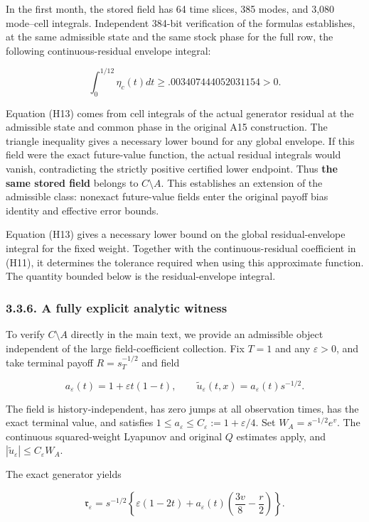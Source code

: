 \documentclass[a4paper,11pt]{article}
\begin{document}
In the first month, the stored field has 64 time slices, 385 modes, and 3,080 mode–cell integrals. Independent 384-bit verification of the formulas establishes, at the same admissible state and the same stock phase for the full row, the following continuous-residual envelope integral:

\[
\int_{0}^{1/12}\eta_c(t)dt\ge
.003407444052031154>0.
\tag{H13}
\]

Equation (H13) comes from cell integrals of the actual generator residual at the admissible state and common phase in the original A15 construction. The triangle inequality gives a necessary lower bound for any global envelope. If this field were the exact future-value function, the actual residual integrals would vanish, contradicting the strictly positive certified lower endpoint. Thus \textbf{the same stored field} belongs to $C\setminus A$. This establishes an extension of the admissible class: nonexact future-value fields enter the original payoff bias identity and effective error bounds.

Equation (H13) gives a necessary lower bound on the global residual-envelope integral for the fixed weight. Together with the continuous-residual coefficient in (H11), it determines the tolerance required when using this approximate function. The quantity bounded below is the residual-envelope integral.

\subsubsection*{3.3.6. A fully explicit analytic witness}

To verify \(C\setminus A\) directly in the main text, we provide an admissible object independent of the large field-coefficient collection. Fix \(T=1\) and any \(\varepsilon>0\), and take terminal payoff \(R=s_T^{-1/2}\) and field

\[
a_\varepsilon(t)=1+\varepsilon t(1-t),\qquad
\widetilde u_\varepsilon(t,x)=a_\varepsilon(t)s^{-1/2}.
\tag{H17}
\]

The field is history-independent, has zero jumps at all observation times, has the exact terminal value, and satisfies \(1\le a_\varepsilon\le C_\varepsilon:=1+\varepsilon/4\). Set \(W_A=s^{-1/2}e^v\). The continuous squared-weight Lyapunov and original \(Q\) estimates apply, and \(|\widetilde u_\varepsilon|\le C_\varepsilon W_A\).

The exact generator yields

\[
\mathfrak r_\varepsilon
=s^{-1/2}\left\{\varepsilon(1-2t)
+a_\varepsilon(t)\left(\frac{3v}{8}-\frac r2\right)\right\}.
\tag{H18}
\]
\end{document}
